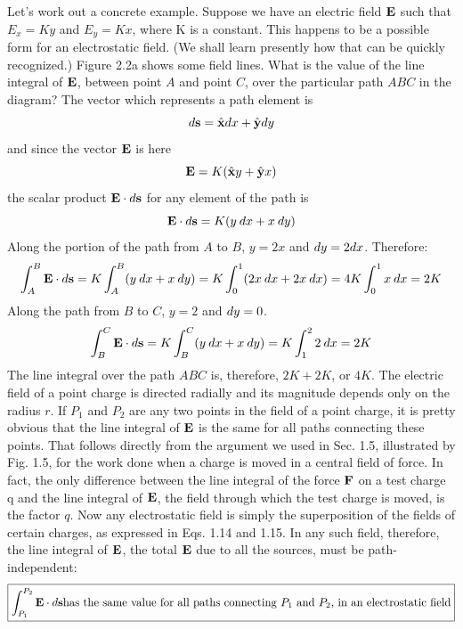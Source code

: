 Let's work out a concrete example. Suppose we have an electric
field $\mathbf{E}$ such that $E_x = Ky$ and $E_y = Kx$, where K is a constant. This
happens to be a possible form for an electrostatic field. (We shall
learn presently how that can be quickly recognized.) Figure 2.2a
shows some field lines. What is the value of the line integral of $\mathbf{E}$,
between point $A$ and point $C$, over the particular path $ABC$ in the
diagram? The vector which represents a path element is
\begin{equation}
  d \mathbf{s} = \hat{\mathbf{x}} d x + \hat{\mathbf{y}} d y
\end{equation}
and since the vector $\mathbf{E}$ is here
\begin{equation}
  \mathbf{E} = K(\hat{\mathbf{x}} y + \hat{\mathbf{y}} x)
\end{equation}
the scalar product $\mathbf{E}\cdot d\mathbf{s}$ for any element of the path is
\begin{equation}
  \mathbf{E}\cdot d\mathbf{s} = K(y\:d x + x\: d y)
\end{equation}
Along the portion of the path from $A$ to $B$, $y = 2x$ and $d y = 2 dx$.
Therefore:
\begin{equation}
  \int_A^B \mathbf{E}\cdot d\mathbf{s} = K\int_A^B  (y\:d x+x\:d y)
         = K\int_0^1(2x\:d x+2x\:d x)
         = 4K\int_0^1 x \:d x = 2K
\end{equation}
Along the path from $B$ to $C$, $y = 2$ and $d y = 0$.
\begin{equation}
  \int_B^C \mathbf{E}\cdot d\mathbf{s} = K \int_B^C(y\:d x+x\:d y) = K\int_1^22\:d x = 2K
\end{equation}
The line integral over the path $ABC$ is, therefore, $2K + 2K$, or $4K$.
The electric field of a point charge is directed radially and its magnitude
depends only on the radius $r$. If $P_1$ and $P_2$ are any two points
in the field of a point charge, it is pretty obvious that the line integral
of $\mathbf{E}$ is the same for all paths connecting these points. That follows
directly from the argument we used in Sec. 1.5, illustrated by Fig. 1.5,
for the work done when a charge is moved in a central field of force.
In fact, the only difference between the line integral of the force $\mathbf{F}$ on
a test charge q and the line integral of $\mathbf{E}$, the field through which the
test charge is moved, is the factor $q$. Now any electrostatic field is
simply the superposition of the fields of certain charges, as expressed
in Eqs. 1.14 and 1.15. In any such field, therefore, the line integral
of $\mathbf{E}$, the total $\mathbf{E}$ due to all the sources, must be path-independent:
\begin{equation}
\boxed{
  \int_{P_1}^{P_2} \mathbf{E}\cdot d\mathbf{s} \text{has the same value for all paths connecting
       $P_1$ and $P_2$, in an electrostatic field}
}
\end{equation}

